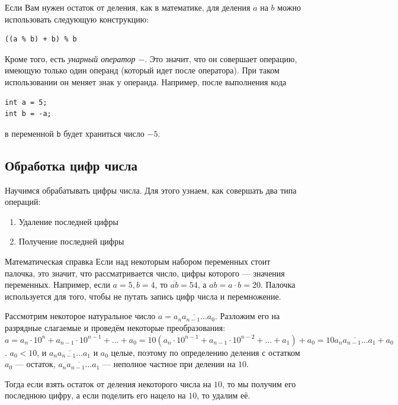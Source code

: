 \documentclass{article}
\newcommand{\mathhelp}[1]{
	\begin{sectionenv}[blue!30!white]{Математическая справка}
		#1
	\end{sectionenv}
}
\begin{document}
	Если Вам нужен остаток от деления, как в математике, для деления $a$ на $b$ можно использовать следующую конструкцию:
	
	\begin{lstlisting}
((a % b) + b) % b
	\end{lstlisting}
	
	Кроме того, есть \textit{унарный оператор} $-$. Это значит, что он совершает операцию, имеющую только один операнд (который идет после оператора). При таком использовании он меняет знак у операнда. Например, после выполнения кода
	
	\begin{lstlisting}
int a = 5;
int b = -a;
	\end{lstlisting}
	
	в переменной \texttt{b} будет храниться число $-5$.
	
	\subsection{Обработка цифр числа}
	
	Научимся обрабатывать цифры числа. Для этого узнаем, как совершать два типа операций:
	
	\begin{enumerate}
		\item{Удаление последней цифры}
		\item{Получение последней цифры}
	\end{enumerate}
	
	\mathhelp{Если над некоторым набором переменных стоит палочка, это значит, что рассматривается число, цифры которого --- значения переменных. Например, если $a=5, b=4$, то $\overline{ab}=54$, а $ab = a\cdot b = 20$. Палочка используется для того, чтобы не путать запись цифр числа и перемножение.}
	
	Рассмотрим некоторое натуральное число $a=\overline{a_n a_{n - 1}\dots a_0}$. Разложим его на разрядные слагаемые и проведём некоторые преобразования: $a=a_n \cdot 10^n + a_{n - 1} \cdot 10^{n - 1} + \dots + a_0 = 10 (a_n \cdot 10^{n - 1} + a_{n - 1} \cdot 10^{n - 2} + \dots + a_1) + a_0=10\overline{a_n a_{n - 1} \dots a_1} + a_0$. $a_0 < 10$, и $\overline{a_n a_{n - 1} \dots a_1}$ и $a_0$ целые, поэтому по определению деления с остатком $a_0$ --- остаток, $\overline{a_n a_{n - 1}\dots a_1}$ --- неполное частное при делении на $10$.
	
	Тогда если взять остаток от деления некоторого числа на $10$, то мы получим его последнюю цифру, а если поделить его нацело на $10$, то удалим её.
	
\end{document}
